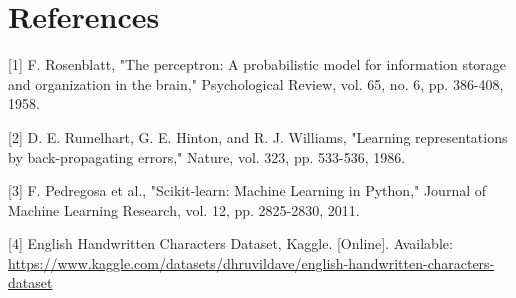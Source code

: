 \documentclass[11pt]{article}
\begin{document}
\section{References}
\label{sec:orgd932dcf}

[1] F. Rosenblatt, "The perceptron: A probabilistic model for information storage and
organization in the brain," Psychological Review, vol. 65, no. 6, pp. 386-408, 1958.

[2] D. E. Rumelhart, G. E. Hinton, and R. J. Williams, "Learning representations by
back-propagating errors," Nature, vol. 323, pp. 533-536, 1986.

[3] F. Pedregosa et al., "Scikit-learn: Machine Learning in Python," Journal of Machine
Learning Research, vol. 12, pp. 2825-2830, 2011.

[4] English Handwritten Characters Dataset, Kaggle. [Online]. Available:
\url{https://www.kaggle.com/datasets/dhruvildave/english-handwritten-characters-dataset}
\end{document}
